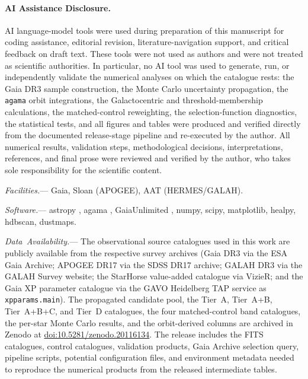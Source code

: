\documentclass{aa}  %
\providecommand{\doi}{}
\renewcommand{\doi}[1]{\href{https://doi.org/#1}{doi:#1}}
\newcommand{\availabilitynote}[1]{\par\vspace{1.5ex}\noindent\mbox{{\small\itshape #1.}}---\ignorespaces}
\begin{document}
\paragraph{AI Assistance Disclosure.}
AI language-model tools were used during preparation of this manuscript
for coding assistance, editorial revision, literature-navigation support,
and critical feedback on draft text.  These tools were not used as
authors and were not treated as scientific authorities.  In particular,
no AI tool was used to generate, run, or independently validate the
numerical analyses on which the catalogue rests: the Gaia DR3 sample
construction, the Monte Carlo uncertainty propagation, the
\texttt{agama} orbit integrations, the Galactocentric and
threshold-membership calculations, the matched-control reweighting, the
selection-function diagnostics, the statistical tests, and all figures
and tables were produced and verified directly from the documented
release-stage pipeline and re-executed by the author.  All numerical
results, validation steps, methodological decisions, interpretations,
references, and final prose were reviewed and verified by the author,
who takes sole responsibility for the scientific content.


\availabilitynote{Facilities}
Gaia, Sloan (APOGEE), AAT (HERMES/GALAH).

\availabilitynote{Software}
astropy
\citep{AstropyCollaboration2013,AstropyCollaboration2018,AstropyCollaboration2022},
agama \citep{Vasiliev2019}, GaiaUnlimited \citep{CastroGinard2023},
numpy, scipy, matplotlib, healpy, hdbscan, dustmaps.

\availabilitynote{Data Availability}
The observational source catalogues used in this work are publicly
available from the respective survey archives (Gaia DR3 via the
ESA Gaia Archive; APOGEE DR17 via the SDSS DR17 archive; GALAH DR3 via
the GALAH Survey website; the \citealt{Queiroz2023} StarHorse
value-added catalogue via VizieR; and the \citealt{Zhang2023} Gaia XP parameter
catalogue via the GAVO Heidelberg TAP service as
\texttt{xpparams.main}).  The propagated candidate pool, the Tier~A,
Tier~A+B, Tier~A+B+C, and Tier~D catalogues, the four matched-control
band catalogues, the per-star Monte Carlo results, and the orbit-derived
columns are archived in Zenodo at \doi{10.5281/zenodo.20116134}.  The
release includes the FITS catalogues, control catalogues, validation
products, Gaia Archive selection query, pipeline scripts, potential
configuration files, and environment metadata needed to reproduce the
numerical products from the released intermediate tables.
\end{document}

